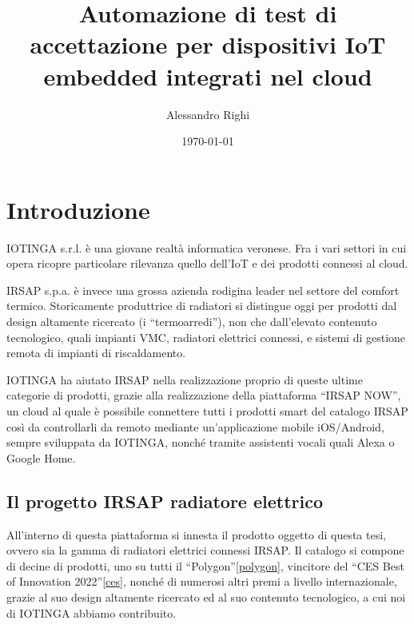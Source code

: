 \documentclass[a4paper,titlepage]{article}
\title{Automazione di test di accettazione per dispositivi IoT embedded integrati nel cloud}
\author{Alessandro Righi}
\date{\today}
\begin{document}
\begin{frontespizio}
\end{frontespizio}

\tableofcontents
\pagebreak

\section{Introduzione}

IOTINGA s.r.l. è una giovane realtà informatica veronese. Fra i vari settori in cui
opera ricopre particolare rilevanza quello dell'IoT e dei prodotti connessi al cloud.

IRSAP s.p.a. è invece una grossa azienda rodigina leader nel settore del comfort termico.
Storicamente produttrice di radiatori si distingue oggi per prodotti dal design altamente
ricercato (i ``termoarredi''), non che dall'elevato contenuto tecnologico, quali
impianti VMC, radiatori elettrici connessi, e sistemi di gestione remota di impianti di riscaldamento.

IOTINGA ha aiutato IRSAP nella realizzazione proprio di queste ultime categorie di
prodotti, grazie alla realizzazione della piattaforma ``IRSAP NOW'', un cloud
al quale è possibile connettere tutti i prodotti smart del catalogo IRSAP così da controllarli
da remoto mediante un'applicazione mobile iOS/Android, sempre sviluppata da IOTINGA,
nonché tramite assistenti vocali quali Alexa o Google Home.

\subsection{Il progetto IRSAP radiatore elettrico}

All'interno di questa piattaforma si innesta il prodotto oggetto di questa tesi,
ovvero sia la gamma di radiatori elettrici connessi IRSAP. Il catalogo si compone di
decine di prodotti, uno su tutti il ``Polygon''\ref{polygon}, vincitore del ``CES Best of Innovation 2022''\ref{ces},
nonché di numerosi altri premi a livello internazionale, grazie al suo design
altamente ricercato ed al suo contenuto tecnologico, a cui noi di IOTINGA abbiamo contribuito.
\end{document}
